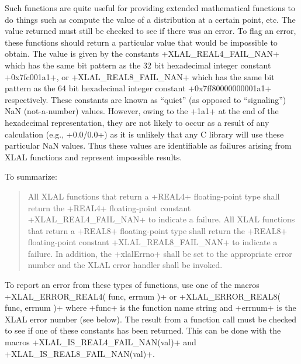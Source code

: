 \documentclass[10pt]{ligodcc}
\makeatletter
\def\verb{\relax\ifmmode\hbox\else\leavevmode\null\fi
  \bgroup
    \color{blue}\small
    \verb@eol@error \let\do\@makeother \dospecials
    \verbatim@font\@noligs
    \@ifstar\@sverb\@verb}
\newlength{\fminilength}
\newenvironment{fminipage}[1][\linewidth]
  {\setlength{\fminilength}{#1-2\fboxsep-2\fboxrule}%
   \begin{lrbox}{\fminibox}\begin{minipage}{\fminilength}}
  {\end{minipage}\end{lrbox}\noindent\fbox{\usebox{\fminibox}}}
\newenvironment{lalrule}{\begin{quote}\color{red}\begin{fminipage}}
  {\end{fminipage}\end{quote}}
\makeatother
\begin{document}
\begin{enumerate}
Such functions are quite useful for providing extended mathematical functions
to do things such as compute the value of a distribution at a certain point,
etc.  The value returned must still be checked to see if there was an error.
To flag an error, these functions should return a particular value that would
be impossible to obtain.  The value is given by the constants
\verb+XLAL_REAL4_FAIL_NAN+ which has the same bit pattern as the 32 bit
hexadecimal integer constant \verb+0x7fc001a1+, or \verb+XLAL_REAL8_FAIL_NAN+
which has the same bit pattern as the 64 bit hexadecimal integer constant
\verb+0x7ff80000000001a1+ respectively.  These constants are known as ``quiet''
(as opposed to ``signaling'') NaN (not-a-number) values.  However, owing to the
\verb+1a1+ at the end of the hexadecimal representation, they are not likely to
occur as a result of any calculation (e.g., \verb+0.0/0.0+) as it is unlikely
that any C library will use these particular NaN values.  Thus these values are
identifiable as failures arising from XLAL functions and represent impossible
results.

To summarize:
\begin{lalrule}
All XLAL functions that return a \verb+REAL4+ floating-point type shall return
the \verb+REAL4+ floating-point constant \verb+XLAL_REAL4_FAIL_NAN+ to indicate
a failure.  All XLAL functions that return a \verb+REAL8+ floating-point type
shall return the \verb+REAL8+ floating-point constant
\verb+XLAL_REAL8_FAIL_NAN+ to indicate a failure.
In addition, the \verb+xlalErrno+ shall be set to the appropriate error number
and the XLAL error handler shall be invoked.
\end{lalrule}
To report an error from these types of functions, use one of the macros
\verb+XLAL_ERROR_REAL4( func, errnum )+ or
\verb+XLAL_ERROR_REAL8( func, errnum )+ where \verb+func+ is the function name
string and \verb+errnum+ is the XLAL error number (see below).  The result from
a function call must be checked to see if one of these constants has been
returned.  This can be done with the macros \verb+XLAL_IS_REAL4_FAIL_NAN(val)+
and \verb+XLAL_IS_REAL8_FAIL_NAN(val)+.


\end{enumerate}
\end{document}

